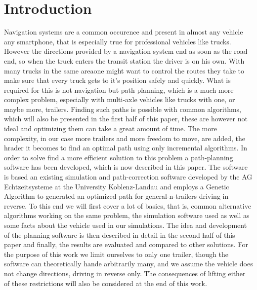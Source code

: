 \chapter{Introduction}
\label{cha:introduction}

Navigation systems are a common occurence and present in almost any vehicle any smartphone, that is especially true for professional vehicles like trucks. However the directions provided by a navigation system end as soon as the road end, so when the truck enters the transit station the driver is on his own. With many trucks in the same areaone might want to control the routes they take to make sure that every truck gets to it's position safely and quickly. What is required for this is not navigation but path-planning, which is a much more complex problem, especially with multi-axle vehicles like trucks with one, or maybe more, trailers. Finding such paths is possible with common algorithms, which will also be presented in the first half of this paper, these are however not ideal and optimizing them can take a great amount of time. The more complexity, in our case more trailers and more freedom to move, are added, the hrader it becomes to find an optimal path using only incremental algorithms. In order to solve find a more efficient solution to this problem a path-planning software has been developed, which is now described in this paper. The software is based an existing simulation and path-correction software developed by the AG Echtzeitsysteme at the University Koblenz-Landau and employs a Genetic Algorithm to generated an optimized path for general-n-trailers driving in reverse. 
To this end we will first cover a lot of basics, that is, common alternative algorithms working on the same problem, the simulation software used as well as some facts about the vehicle used in our simulations. The idea and development of the planning software is then described in detail in the second half of this paper and finally, the results are evaluated and compared to other solutions. For the purpose of this work we limit ourselves to only one trailer, though the software can theoretically hande arbitrarily many, and we assume the vehicle does not change directions, driving in reverse only. The consequences of lifting either of these restrictions will also be considered at the end of this work.
